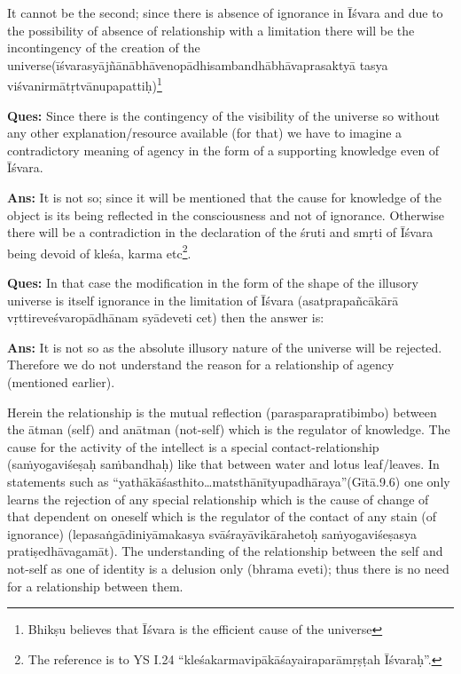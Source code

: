 It cannot be the second; since there is absence of ignorance in Īśvara and due to the possibility of absence of relationship with a limitation there will be the incontingency of the creation of the universe\break (īśvarasyājñānābhāvenopādhisambandhābhāvaprasaktyā tasya viśva\-nirmātṛtvānupapattiḥ)\footnote{Bhikṣu believes that Īśvara is the efficient cause of the universe}

\textbf{Ques:} Since there is the contingency of the visibility of the universe so without any other explanation/resource available (for that) we have to imagine a contradictory meaning of agency in the form of a supporting knowledge even of Īśvara.

\textbf{Ans:} It is not so; since it will be mentioned that the cause for knowledge of the object is its being reflected in the consciousness and not of ignorance. Otherwise there will be a contradiction in the declaration of the śruti and smṛti of Īśvara being devoid of kleśa, karma etc\footnote{The reference is to YS I.24 “kleśakarmavipākāśayairaparāmṛṣṭah Īśvaraḥ”.}.

\textbf{Ques:} In that case the modification in the form of the shape of the illusory universe is itself ignorance in the limitation of Īśvara (asatprapañcākārā vṛttireveśvaropādhānam syādeveti cet) then the answer is:

\textbf{Ans:} It is not so as the absolute illusory nature of the universe will be rejected. Therefore we do not understand the reason for a relationship of agency (mentioned earlier).

Herein the relationship is the mutual reflection (parasparapratibimbo) between the ātman (self) and anātman (not-self) which is the regulator of knowledge. The cause for the activity of the intellect is a special contact-relationship (saṁyogaviśeṣaḥ saṁbandhaḥ) like that between water and lotus leaf/leaves. In statements such as “yathākāśasthito…matsthānītyupadhāraya”(Gītā.9.6) one only learns the rejection of any special relationship which is the cause of change of that dependent on oneself which is the regulator of the contact of any stain (of ignorance) (lepasaṅgādiniyāmakasya svāśrayāvikārahetoḥ saṁyogaviśeṣasya pratiṣedhāvagamāt). The understanding of the relationship between the self and not-self as one of identity is a delusion only (bhrama eveti); thus there is no need for a relationship between them.


